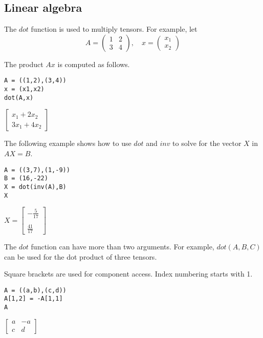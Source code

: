 \subsection{Linear algebra}

The $dot$ function is used to multiply tensors.
For example, let
\begin{equation*}
A=\begin{pmatrix}1&2\\3&4\end{pmatrix},
\quad
x=\begin{pmatrix}x_1\\x_2\end{pmatrix}
\end{equation*}

\noindent
The product $Ax$ is computed as follows.

{\color{blue}
\begin{verbatim}
A = ((1,2),(3,4))
x = (x1,x2)
dot(A,x)
\end{verbatim}
}

\noindent
$\displaystyle
\begin{bmatrix}
x_1+2x_2
\\[1ex]
3x_1+4x_2
\end{bmatrix}
$

\bigskip
\noindent
The following example shows how to use $dot$ and $inv$ to solve for
the vector $X$ in $AX=B$.

{\color{blue}
\begin{verbatim}
A = ((3,7),(1,-9))
B = (16,-22)
X = dot(inv(A),B)
X
\end{verbatim}
}

\noindent
$\displaystyle
X=
\begin{bmatrix}
-\tfrac{5}{17}
\\
\\
\tfrac{41}{17}
\end{bmatrix}
$

\bigskip
\noindent
The $dot$ function can have more than two arguments.
For example, $dot(A,B,C)$ can be used for the dot product of three tensors.

\bigskip
\noindent
Square brackets are used for component access.
Index numbering starts with 1.

{\color{blue}
\begin{verbatim}
A = ((a,b),(c,d))
A[1,2] = -A[1,1]
A
\end{verbatim}
}

\noindent
$\displaystyle
\begin{bmatrix}
a & -a
\\[1ex]
c & d
\end{bmatrix}
$

